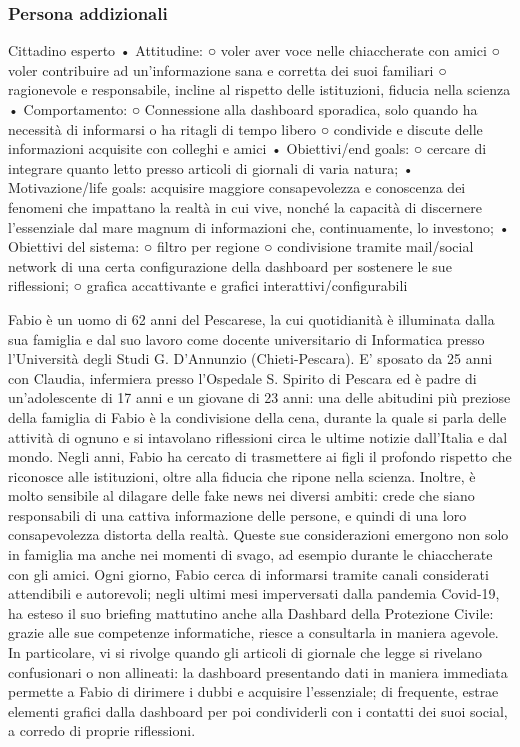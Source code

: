 \subsubsection*{Persona addizionali}
Cittadino esperto
	• Attitudine:
		○ voler aver voce nelle chiaccherate con amici
		○ voler contribuire ad un'informazione sana e corretta dei suoi familiari 
		○ ragionevole e responsabile, incline al rispetto delle istituzioni, fiducia nella scienza
	• Comportamento: 
		○ Connessione alla dashboard sporadica, solo quando ha necessità di informarsi o ha ritagli di tempo libero
		○ condivide e discute delle informazioni acquisite con colleghi e amici
	• Obiettivi/end goals:
		○ cercare di integrare quanto letto presso articoli di giornali di varia natura;
	• Motivazione/life goals: acquisire maggiore consapevolezza e conoscenza dei fenomeni che impattano la realtà in cui vive, nonché la capacità di discernere l'essenziale dal mare magnum di informazioni che, continuamente, lo investono;
	• Obiettivi del sistema:
		○ filtro per regione
		○ condivisione tramite mail/social network di una certa configurazione della dashboard per sostenere le sue riflessioni;
		○ grafica accattivante e grafici interattivi/configurabili

Fabio è un uomo di 62 anni del Pescarese, la cui quotidianità è illuminata dalla sua famiglia e dal suo lavoro come docente universitario di Informatica presso l'Università degli Studi G. D'Annunzio (Chieti-Pescara).
E' sposato da 25 anni con Claudia, infermiera presso l'Ospedale S. Spirito di Pescara ed è padre di un'adolescente di 17 anni e un giovane di 23 anni: una delle abitudini più preziose della famiglia di Fabio è la condivisione della cena, durante la quale si parla delle attività di ognuno e si intavolano riflessioni circa le ultime notizie dall'Italia e dal mondo.
Negli anni, Fabio ha cercato di trasmettere ai figli il profondo rispetto che riconosce alle istituzioni, oltre alla fiducia che ripone nella scienza. Inoltre, è molto sensibile al dilagare delle fake news nei diversi ambiti: crede che siano responsabili di una cattiva informazione delle persone, e quindi di una loro consapevolezza distorta della realtà. 
Queste sue considerazioni emergono non solo in famiglia ma anche nei momenti di svago, ad esempio durante le chiaccherate con gli amici.
Ogni giorno, Fabio cerca di informarsi tramite canali considerati attendibili e autorevoli; negli ultimi mesi imperversati dalla pandemia Covid-19, ha esteso il suo briefing mattutino anche alla Dashbard della Protezione Civile: grazie alle sue competenze informatiche, riesce a consultarla in maniera agevole. In particolare, vi si rivolge quando gli articoli di giornale che legge si rivelano confusionari o non allineati: la dashboard presentando dati in maniera immediata permette a Fabio di dirimere i dubbi e acquisire l'essenziale; di frequente, estrae elementi grafici dalla dashboard per poi condividerli con i contatti dei suoi social, a corredo di proprie riflessioni.


